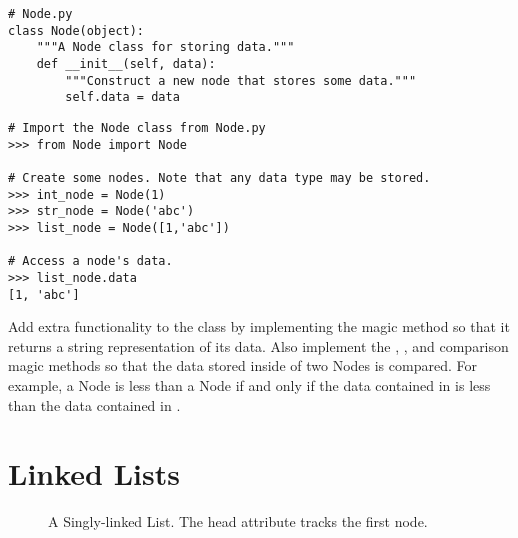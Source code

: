 \begin{lstlisting}
# Node.py
class Node(object):
	"""A Node class for storing data."""
	def __init__(self, data):
		"""Construct a new node that stores some data."""
		self.data = data
\end{lstlisting}

\begin{lstlisting}
# Import the Node class from Node.py
>>> from Node import Node

# Create some nodes. Note that any data type may be stored.
>>> int_node = Node(1)
>>> str_node = Node('abc')
>>> list_node = Node([1,'abc'])

# Access a node's data.
>>> list_node.data
[1, 'abc']
\end{lstlisting}

\begin{problem}
Add extra functionality to the  class by implementing the  magic method so that it returns a string representation of its data.
Also implement the , , and  comparison magic methods so that the data stored inside of two Nodes is compared.
For example, a Node  is less than a Node  if and only if the data contained in  is less than the data contained in .
\end{problem}

\section*{Linked Lists}

\begin{figure}
\centering
{}
\caption{A Singly-linked List. The head attribute tracks the first node.}
\label{fig:singly_linked}
\end{figure}

